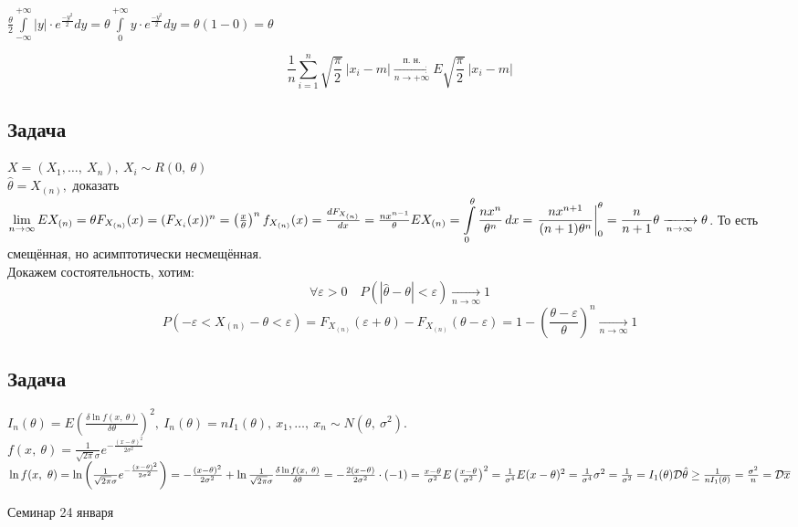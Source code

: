 \documentclass[12pt, a4paper]{article}
\newcommand{\dev}{\mathcal{D}}
\begin{document}
$\displaystyle\frac{\theta}{2}\int \limits_{-\infty}^{+\infty}|y|\cdot e^{\frac{-y^2}{2}} dy  = \theta \int \limits_{0}^{+\infty} y\cdot e^{\frac{-y^2}{2}} dy = \theta (1-0) = \theta$


\[\frac{1}{n}\sum \limits_{i=1}^{n} \sqrt{\frac{\pi}{2}} \ |x_i-m| \xrightarrow[n\to+\infty]{\text{п.\ н.}}  E\sqrt{\frac{\pi}{2}} \ |x_i-m|\]

\subsection*{Задача}
$X = (X_1,\dots,\ X_n),\ X_i\sim R(0,\ \theta)$\\
$\hat{\theta} = X_{(n)},$ доказать $ \lim\limits_{n\to\infty} EX_{(n)} = \theta\\
F_{X_{(n)}} (x) = (F_{X_i}(x))^n = \left(\frac{x}{\theta}\right)^n\\
f_{X_{(n)}} (x) = \frac{d F_{X_{(n)}}}{dx} = \frac{nx^{n - 1}}{\theta}\\
\displaystyle E X_{(n)} = \int \limits _0^{\theta} \frac{n x^n}{\theta^n}\, dx = \left.\frac{n x^{n + 1}}{(n + 1)\theta^n} \right|_0^{\theta} = \frac{n}{n + 1}\theta \xrightarrow[n\to\infty]{} \theta$. То есть смещённая, но асимптотически несмещённая.\\
Докажем состоятельность, хотим:
\[\forall \varepsilon > 0\quad P(|\hat{\theta} - \theta| < \varepsilon) \xrightarrow[n\to\infty]{} 1\]
\[P(-\varepsilon < X_{(n)} - \theta < \varepsilon) = F_{X_(n)} (\varepsilon + \theta) - F_{X_{(n)}}(\theta - \varepsilon) = 1 - \left( \frac{\theta - \varepsilon}{\theta} \right)^n \xrightarrow[n\to\infty]{} 1\]
\subsection*{Задача}
$I_n(\theta) = E\left( \frac{\delta \ln f(x,\ \theta)}{\delta \theta} \right)^2,\ I_n(\theta) = nI_1(\theta),\ x_1,\dots,\ x_n\sim N(\theta,\ \sigma^2)$.\\
$f(x,\ \theta) = \frac{1}{\sqrt{2\pi}\sigma} e^{-\frac{(x - \theta)^2}{2\sigma^2}}$\\
$\ln f(x,\ \theta) = \ln \left( \frac{1}{\sqrt{2\pi}\sigma }e^{-\frac{(x - \theta)^2}{2\sigma^2}} \right) = -\frac{(x - \theta)^2}{2\sigma^2} + \ln \frac{1}{\sqrt{2\pi}\sigma}\\
\frac{\delta\ln f(x,\ \theta)}{\delta\theta} = -\frac{2(x - \theta)}{2\sigma^2}\cdot (-1) = \frac{x - \theta}{\sigma^2}\\
E\left( \frac{x - \theta}{\sigma^2} \right)^2 = \frac{1}{\sigma^4} E(x - \theta)^2 = \frac{1}{\sigma^4} \sigma^2 = \frac{1}{\sigma^2} = I_1(\theta)\\
\dev \hat{\theta} \geq \frac{1}{nI_1(\theta)} = \frac{\sigma^2}{n} =\mathcal{D}\overline{x}$
\begin{center}
    Семинар 24 января
\end{center}
\end{document}
